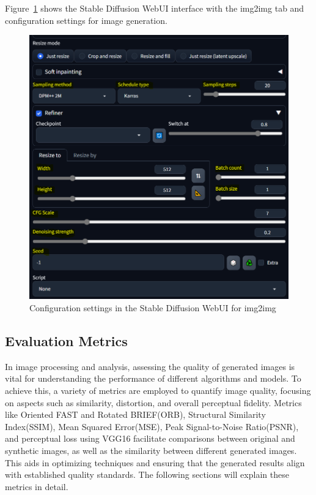 \documentclass[12pt,DIV14,BCOR12mm,a4paper,footinclude=false,headinclude,parskip=half-,twoside,openright,cleardoublepage=empty,toc=index,bibliography=totoc,listof=totoc]{scrreprt}
\numberwithin{equation}{chapter}
\begin{document}
Figure~\ref{fig:webui_screenshot} shows the Stable Diffusion WebUI interface with the img2img tab and configuration settings for image generation.
\begin{figure}
	\centering
	\includegraphics[scale=.6]{../media/stable_diffusion_webui.PNG}
	\caption{Configuration settings in the Stable Diffusion WebUI for img2img}
	\label{fig:webui_screenshot}
\end{figure}
		
\subsection{Evaluation Metrics}
In image processing and analysis, assessing the quality of generated images is vital for understanding the performance of different algorithms and models. To achieve this, a variety of metrics are employed to quantify image quality, focusing on aspects such as similarity, distortion, and overall perceptual fidelity. Metrics like Oriented FAST and Rotated BRIEF(ORB), Structural Similarity Index(SSIM), Mean Squared Error(MSE), Peak Signal-to-Noise Ratio(PSNR), and perceptual loss using VGG16 facilitate comparisons between original and synthetic images, as well as the similarity between different generated images. This aids in optimizing techniques and ensuring that the generated results align with established quality standards. The following sections will explain these metrics in detail.
\end{document}
